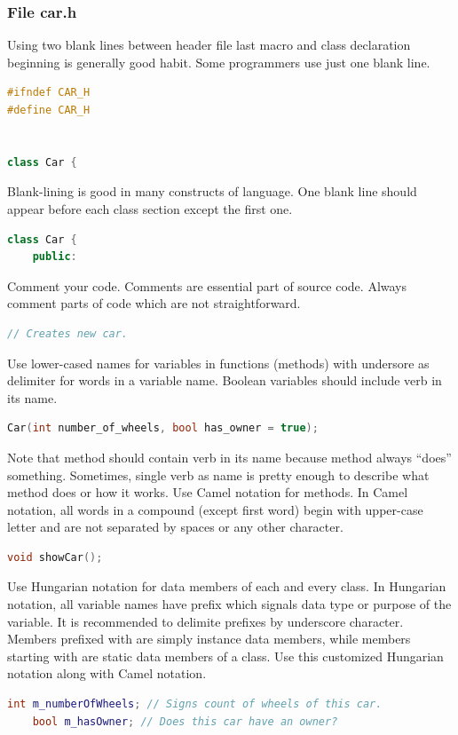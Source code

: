 \subsubsection*{File car.h}
Using two blank lines between header file last macro and class declaration beginning is generally good habit. Some programmers use just one blank line.
\begin{lstlisting}[firstnumber=1,language=cpp]
#ifndef CAR_H
#define CAR_H


class Car {
\end{lstlisting}
Blank-lining is good in many constructs of \cpp language. One blank line should appear before each class section except the first one.
\begin{lstlisting}[firstnumber=5,language=cpp]
class Car {
    public:
\end{lstlisting}
Comment your code. Comments are essential part of source code. Always comment parts of code which are not straightforward.
\begin{lstlisting}[firstnumber=7,language=cpp]
	// Creates new car.
\end{lstlisting}
Use lower-cased names for variables in functions (methods) with undersore as delimiter for words in a variable name. Boolean variables should include verb in its name.
\begin{lstlisting}[firstnumber=8,language=cpp]
	Car(int number_of_wheels, bool has_owner = true);
\end{lstlisting}
Note that method should contain verb in its name because method always \enquote{does} something. Sometimes, single verb as name is pretty enough to describe what method does or how it works. Use Camel notation for methods. In Camel notation, all words in a compound (except first word) begin with upper-case letter and are not separated by spaces or any other character.
\begin{lstlisting}[firstnumber=11,language=cpp]
	void showCar();
\end{lstlisting}
Use Hungarian notation for data members of each and every class. In Hungarian notation, all variable names have prefix which signals data type or purpose of the variable. It is recommended to delimite prefixes by underscore character. Members prefixed with are simply instance data members, while members starting with are static data members of a class. Use this customized Hungarian notation along with Camel notation.
\begin{lstlisting}[firstnumber=14,language=cpp]
	int m_numberOfWheels; // Signs count of wheels of this car.
	bool m_hasOwner; // Does this car have an owner?
\end{lstlisting}

